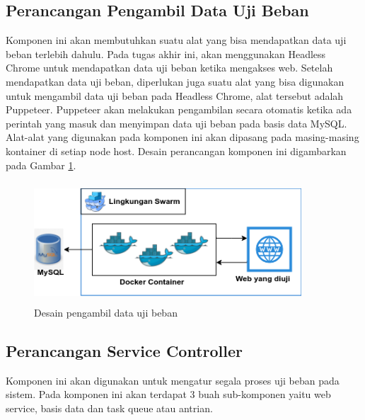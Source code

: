     	\subsection{Perancangan Pengambil Data Uji Beban}
    		Komponen ini akan membutuhkan suatu alat yang bisa mendapatkan data uji beban terlebih dahulu. Pada tugas akhir ini, akan menggunakan Headless Chrome untuk mendapatkan data uji beban ketika mengakses web. Setelah mendapatkan data uji beban, diperlukan juga suatu alat yang bisa digunakan untuk mengambil data uji beban pada Headless Chrome, alat tersebut adalah Puppeteer. Puppeteer akan melakukan pengambilan secara otomatis ketika ada perintah yang masuk dan menyimpan data uji beban pada basis data MySQL. Alat-alat yang digunakan pada komponen ini akan dipasang pada masing-masing kontainer di setiap node host. Desain perancangan komponen ini digambarkan pada Gambar \ref{puppdesain}.
    		\begin{figure}[H]
    			\centering
    			\includegraphics[width=10cm,height=4.5cm]{Images/C-3/puppdesain.png}
    			\caption{Desain pengambil data uji beban}
    			\label{puppdesain}
    		\end{figure}
    	
    	\subsection{Perancangan Service Controller}
    		Komponen ini akan digunakan untuk mengatur segala proses uji beban pada sistem. Pada komponen ini akan terdapat 3 buah sub-komponen yaitu web service, basis data dan task queue atau antrian.
    	
